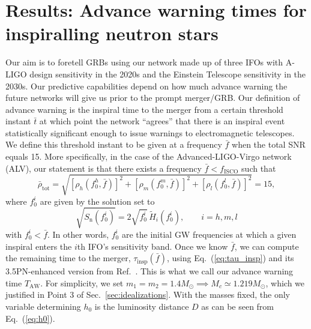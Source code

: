 \documentclass[amsmath,amssymb,aps,floats,amsfonts,notitlepage,superscriptaddress,eqsecnum,nofootinbib,10pt]{revtex4-1}
\newcommand{\f}{\frac}
\newcommand{\be}{\begin{equation}}
\newcommand{\ee}{\end{equation}}
\begin{document}
\section{Results: Advance warning times for inspiralling neutron stars}\label{sec:results}
 Our aim is to foretell GRBs using our network made up of three IFOs with A-LIGO design sensitivity in the 2020s and the Einstein Telescope sensitivity in the 2030s.
 Our predictive capabilities depend on how much advance warning the future networks will give us prior to the prompt merger/GRB.
 Our definition of advance warning is the inspiral time to the merger from a certain threshold instant $\bar{t}$ at which point the network ``agrees'' that there is an inspiral 
 event statistically significant enough to issue warnings to electromagnetic telescopes.
 We define this threshold instant to be given at a frequency $\bar{f}$ when the total SNR equals 15. 
 More specifically, in the case of the Advanced-LIGO-Virgo network (ALV), our statement is that there exists a frequency $\bar{f} < f_\text{ISCO}$ such that
 \be
 \bar\rho_\text{tot}= \sqrt{\left[\rho_h(f_0^h,\bar{f})\right]^2+\left[\rho_m(f_0^m,\bar{f})\right]^2+\left[\rho_l(f_0^l,\bar{f})\right]^2}=15, \label{eq:SNR_bar}%
 \ee
 where $f_0^i$ are given by the solution set to
 \be
 \sqrt{S_\text{n}(f_0^i)} = 2\sqrt{f_0^i}\, \tilde{H}_i(f_0^i) \label{eq:f0},\qquad i=h,m,l
 \ee
 with $f_0^i < \bar{f}$. In other words, $f_0^i$ are the initial GW frequencies at which a given inspiral enters the $i$th IFO's sensitivity band. 
 Once we know $\bar{f}$, we can compute the remaining time to the merger, $\tau_\text{insp}(\bar{f})$, using Eq.~(\ref{eq:tau_insp})
 and its 3.5PN-enhanced version from Ref.~\cite{Blanchet_LRR}. This is what we call our advance warning time $T_\text{AW}$.
 For simplicity, we set $m_1=m_2=1.4 M_\odot \implies M_c\simeq 1.219 M_\odot$, which we justified in
 Point 3 of Sec.~\ref{sec:idealizations}. 
 With the masses fixed, the only variable determining $h_0$ is the luminosity distance $D$ as can be seen from Eq.~(\ref{eq:h0}).
\end{document}

